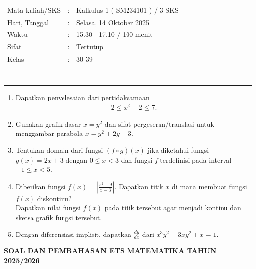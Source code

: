 \documentclass[10pt,openany,a4paper]{article}
\theoremstyle{definition}
\theoremstyle{definition}
\theoremstyle{plain}
\begin{document}
    \begin{center}
	\begin{tabular}{lcl}
		Mata kuliah/SKS & : & Kalkulus 1 ( SM234101 ) / 3 SKS\\
		Hari, Tanggal & : & Selasa, 14 Oktober 2025\\
		Waktu & : & 15.30 - 17.10 / 100 menit\\
		Sifat & : & Tertutup\\
		Kelas & : & 30-39\\
  ~
	\end{tabular}
    
    \noindent\rule{\textwidth}{2.pt}
        \end{center}
        \begin{enumerate}
            \item Dapatkan penyelesaian dari pertidaksamaan 
            \begin{align*}
                2\leq x^2-2\leq 7.
            \end{align*}
            \item Gunakan grafik dasar $x=y^2$ dan sifat pergeseran/translasi untuk menggambar parabola $x=y^2+2y+3$.
            \item Tentukan domain dari fungsi $(f\circ g)(x)$ jika diketahui fungsi $g(x)=2x+3$ dengan $0\leq x<3$ dan fungsi $f$ terdefinisi pada interval $-1\leq x <5$.
            \item Diberikan fungsi $f(x)=\left|\frac{x^2-9}{x-3}\right|$. Dapatkan titik $x$ di mana membuat fungsi $f(x)$ diskontinu?\\
            Dapatkan nilai fungsi $f(x)$ pada titik tersebut agar menjadi kontinu dan sketsa grafik fungsi tersebut.
            \item Dengan diferensiasi implisit, dapatkan $\frac{dy}{dx}$ dari $x^3y^2-3xy^2+x=1$.
        \end{enumerate}
 \newpage
 \begin{center}
	{\underline{\textbf{\MakeUppercase{Soal dan Pembahasan ETS Matematika Tahun 2025/2026}}}}
    \end{center}
\end{document}
